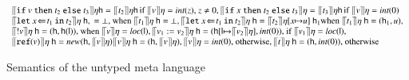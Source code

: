\documentclass[orivec]{llncs}
\newcommand{\keywd}[1]{\mathtt{#1}}
\newcommand{\myread}[1]{!{#1}}
\newcommand{\myref}[1]{\keywd{ref}(#1)}
\newcommand{\intt}[1]{\textit{int}(#1)}
\newcommand{\reff}[1]{\textit{loc}(#1)}
\newcommand{\letin}[2]{\keywd{let}\:{#1}\!\Leftarrow\!{#2}\:\keywd{in}\:}
\newcommand{\assign}[2]{{#1}:={#2}}
\newcommand{\myif}[3]{\keywd{if}\ #1\ \keywd{then}\ #2\
  \keywd{else}\ #3}
\newcommand{\semV}[1]{\ensuremath{\llceil {#1} \rrceil
}}
\newcommand{\cloc}{\ensuremath{\mathsf{l}}\xspace}
\newcommand\heap{\ensuremath{\mathsf{h}}\xspace}
\begin{document}
{\begin{figure*}[tph]
\[\begin{array}{l}
\semV{\myif{v}{t_2}{t_3}}\eta\heap =
\semV{t_2}\eta\heap\,   \mbox{if
  $\semV{v}\eta =\intt z$, $z\neq 0$},
\semV{\myif{x}{t_2}{t_3}}\eta =
\semV{t_3}\eta\heap\,  \mbox{if $\semV{v}\eta=\intt 0$}
\\
\semV{\letin{x}{t_1}{t_2}}\eta\ \heap,\; =
\bot\mbox{, when $\semV{t_1}\eta\ \heap=\bot$}, 
\semV{\letin{x}{t_1}{t_2}}\eta\ \heap= 
\semV{t_2}\eta[x{\mapsto}u]\ \heap_1
\mbox{when $\semV{t_1}\eta\ \heap=(\heap_1,u)$},\\
\semV{\myread{v}}\eta\ \heap = (\heap,\heap(\cloc))\mbox{, when
$\semV{v}\eta=\reff \cloc$}, 
\semV{\assign{v_1}{v_2}}\eta\ \heap =
(\heap[\cloc{\mapsto}\semV{v_2}\eta],\intt 0)\mbox{, if
$\semV{v_1}\eta=\reff
\cloc$},\\
\semV{\myref{v}}\eta\ \heap = \textit{new}(\heap,\semV{v}\eta)
\semV{v}\eta\ \heap =(\heap,\semV{v}\eta), 
\semV{v}\eta =\intt 0\mbox{, otherwise}, 
\semV{t}\eta\ \heap= (\heap,\intt 0)\mbox{, otherwise}
\end{array}
\]
\fi
\caption{Semantics of the untyped meta language \label{seme}}
\vspace{-8mm}
\end{figure*}
}
\end{document}
